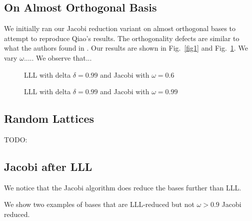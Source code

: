 \documentclass[10pt, a4paper]{article}
\newcommand{\my}[1]{{\color{blue} #1 }}
\begin{document}
\subsection{On Almost Orthogonal Basis}

We initially ran our Jacobi reduction variant on almost orthogonal bases to attempt to reproduce Qiao's results.
The orthogonality defects are similar to \my{what} the authors found in \cite{tian2014hybrid}. \my{Our results are shown in Fig.~\ref{fig1} and Fig.~\ref{fig2}. We vary $\omega$..... We observe that...}

\begin{figure}[H]
\begin{minipage}{.5\textwidth}

  \centering
      \caption{LLL with delta $\delta = 0.99$ and Jacobi with $\omega = 0.6$}
  \label{fig1}
\end{minipage}
\begin{minipage}{.5\textwidth}

  \centering
    
  \caption{LLL with delta $\delta = 0.99$ and Jacobi with $\omega = 0.99$}
  \label{fig2}
\end{minipage}

\end{figure}

\subsection{Random Lattices}

TODO: 

\subsection{Jacobi after LLL}

We notice that the Jacobi algorithm does reduce the bases further than LLL.

We show two examples of bases that are LLL-reduced but not $\omega > 0.9$ Jacobi reduced.
\end{document}
